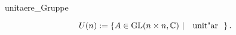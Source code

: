 \documentclass[class=article, crop=false]{standalone}
\begin{document}
\begin{zettel}{unitaere_Gruppe}
\begin{flashcard}
\[
    U (n) := \set{A \in  \GL(n \times n,\C )}{\tx{ unit"ar } }
.\]
\end{flashcard}
\end{zettel}
\end{document}
